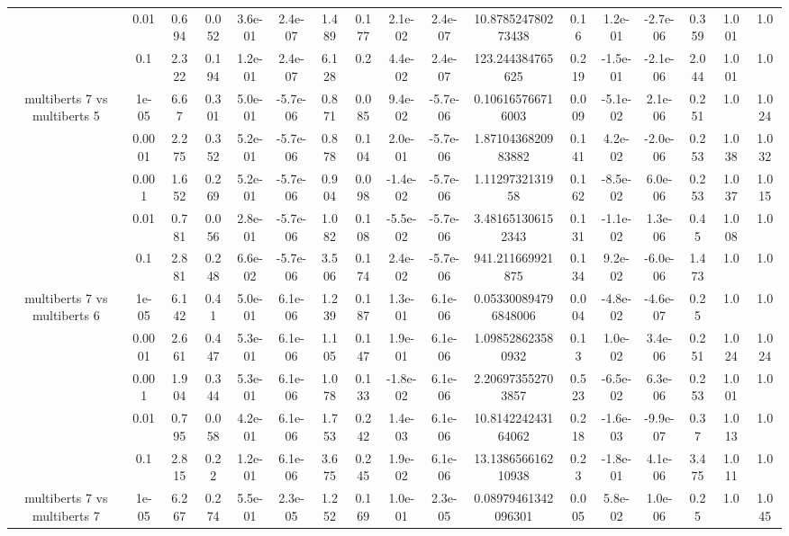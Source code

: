 \begin{tabular}{|c|c|c|c|c|c|c|c|c|c|c|c|c|c|c|c|c|}
 & 0.01 & 0.694 & 0.052 & 3.6e-01 & 2.4e-07 & 1.489 & 0.177 & 2.1e-02 & 2.4e-07 & 10.878524780273438 & 0.16 & 1.2e-01 & -2.7e-06 & 0.359 & 1.001 & 1.0 \\
 & 0.1 & 2.322 & 0.194 & 1.2e-01 & 2.4e-07 & 6.128 & 0.2 & 4.4e-02 & 2.4e-07 & 123.244384765625 & 0.219 & -1.5e-01 & -2.1e-06 & 2.044 & 1.001 & 1.0 \\
\hline
\multirow{5}{*}{multiberts 7 vs multiberts 5} & 1e-05 & 6.67 & 0.301 & 5.0e-01 & -5.7e-06 & 0.871 & 0.085 & 9.4e-02 & -5.7e-06 & 0.106165766716003 & 0.009 & -5.1e-02 & 2.1e-06 & 0.251 & 1.0 & 1.024 \\
 & 0.0001 & 2.275 & 0.352 & 5.2e-01 & -5.7e-06 & 0.878 & 0.104 & 2.0e-01 & -5.7e-06 & 1.8710436820983882 & 0.141 & 4.2e-02 & -2.0e-06 & 0.253 & 1.038 & 1.032 \\
 & 0.001 & 1.652 & 0.269 & 5.2e-01 & -5.7e-06 & 0.904 & 0.098 & -1.4e-02 & -5.7e-06 & 1.1129732131958 & 0.162 & -8.5e-02 & 6.0e-06 & 0.253 & 1.037 & 1.015 \\
 & 0.01 & 0.781 & 0.056 & 2.8e-01 & -5.7e-06 & 1.082 & 0.108 & -5.5e-02 & -5.7e-06 & 3.481651306152343 & 0.131 & -1.1e-02 & 1.3e-06 & 0.45 & 1.008 & 1.0 \\
 & 0.1 & 2.881 & 0.248 & 6.6e-02 & -5.7e-06 & 3.506 & 0.174 & 2.4e-02 & -5.7e-06 & 941.211669921875 & 0.134 & 9.2e-02 & -6.0e-06 & 1.473 & 1.0 & 1.0 \\
\hline
\multirow{5}{*}{multiberts 7 vs multiberts 6} & 1e-05 & 6.142 & 0.41 & 5.0e-01 & 6.1e-06 & 1.239 & 0.187 & 1.3e-01 & 6.1e-06 & 0.053300894796848006 & 0.004 & -4.8e-02 & -4.6e-07 & 0.25 & 1.0 & 1.0 \\
 & 0.0001 & 2.661 & 0.447 & 5.3e-01 & 6.1e-06 & 1.105 & 0.147 & 1.9e-01 & 6.1e-06 & 1.098528623580932 & 0.13 & 1.0e-02 & 3.4e-06 & 0.251 & 1.024 & 1.024 \\
 & 0.001 & 1.904 & 0.344 & 5.3e-01 & 6.1e-06 & 1.078 & 0.133 & -1.8e-02 & 6.1e-06 & 2.206973552703857 & 0.523 & -6.5e-02 & 6.3e-06 & 0.253 & 1.001 & 1.0 \\
 & 0.01 & 0.795 & 0.058 & 4.2e-01 & 6.1e-06 & 1.753 & 0.242 & 1.4e-03 & 6.1e-06 & 10.814224243164062 & 0.218 & -1.6e-03 & -9.9e-07 & 0.37 & 1.013 & 1.0 \\
 & 0.1 & 2.815 & 0.22 & 1.2e-01 & 6.1e-06 & 3.675 & 0.245 & 1.9e-02 & 6.1e-06 & 13.138656616210938 & 0.23 & -1.8e-01 & 4.1e-06 & 3.475 & 1.011 & 1.0 \\
\hline
\multirow{5}{*}{multiberts 7 vs multiberts 7} & 1e-05 & 6.267 & 0.274 & 5.5e-01 & 2.3e-05 & 1.252 & 0.169 & 1.0e-01 & 2.3e-05 & 0.08979461342096301 & 0.005 & 5.8e-02 & 1.0e-06 & 0.25 & 1.0 & 1.045 \\

\end{tabular}
